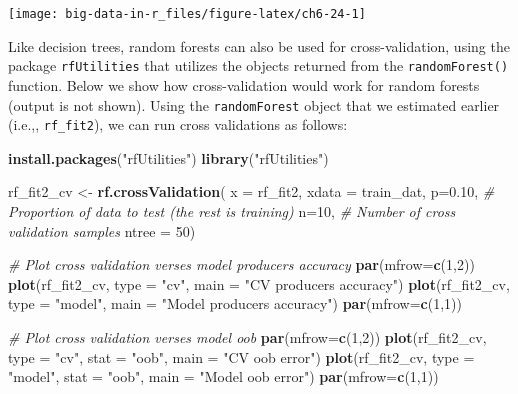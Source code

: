 \documentclass[]{book}
\newenvironment{Shaded}{\begin{snugshade}}{\end{snugshade}}
\newcommand{\CommentTok}[1]{\textcolor[rgb]{0.56,0.35,0.01}{\textit{#1}}}
\newcommand{\DataTypeTok}[1]{\textcolor[rgb]{0.13,0.29,0.53}{#1}}
\newcommand{\DecValTok}[1]{\textcolor[rgb]{0.00,0.00,0.81}{#1}}
\newcommand{\FloatTok}[1]{\textcolor[rgb]{0.00,0.00,0.81}{#1}}
\newcommand{\KeywordTok}[1]{\textcolor[rgb]{0.13,0.29,0.53}{\textbf{#1}}}
\newcommand{\NormalTok}[1]{#1}
\newcommand{\StringTok}[1]{\textcolor[rgb]{0.31,0.60,0.02}{#1}}
\begin{document}
\texttt{[image: big-data-in-r\_files/figure-latex/ch6-24-1]}

Like decision trees, random forests can also be used for cross-validation, using the package \texttt{rfUtilities} that utilizes the objects returned from the \texttt{randomForest()} function. Below we show how cross-validation would work for random forests (output is not shown). Using the \texttt{randomForest} object that we estimated earlier (i.e.,, \texttt{rf\_fit2}), we can run cross validations as follows:

\begin{Shaded}
\begin{Highlighting}[]
\KeywordTok{install.packages}\NormalTok{(}\StringTok{"rfUtilities"}\NormalTok{)}
\KeywordTok{library}\NormalTok{(}\StringTok{"rfUtilities"}\NormalTok{)}

\NormalTok{rf_fit2_cv <-}\StringTok{ }\KeywordTok{rf.crossValidation}\NormalTok{(}
  \DataTypeTok{x =}\NormalTok{ rf_fit2, }
  \DataTypeTok{xdata =}\NormalTok{ train_dat,}
  \DataTypeTok{p=}\FloatTok{0.10}\NormalTok{, }\CommentTok{# Proportion of data to test (the rest is training)}
  \DataTypeTok{n=}\DecValTok{10}\NormalTok{,   }\CommentTok{# Number of cross validation samples}
  \DataTypeTok{ntree =} \DecValTok{50}\NormalTok{)   }


\CommentTok{# Plot cross validation verses model producers accuracy}
\KeywordTok{par}\NormalTok{(}\DataTypeTok{mfrow=}\KeywordTok{c}\NormalTok{(}\DecValTok{1}\NormalTok{,}\DecValTok{2}\NormalTok{)) }
\KeywordTok{plot}\NormalTok{(rf_fit2_cv, }\DataTypeTok{type =} \StringTok{"cv"}\NormalTok{, }\DataTypeTok{main =} \StringTok{"CV producers accuracy"}\NormalTok{)}
\KeywordTok{plot}\NormalTok{(rf_fit2_cv, }\DataTypeTok{type =} \StringTok{"model"}\NormalTok{, }\DataTypeTok{main =} \StringTok{"Model producers accuracy"}\NormalTok{)}
\KeywordTok{par}\NormalTok{(}\DataTypeTok{mfrow=}\KeywordTok{c}\NormalTok{(}\DecValTok{1}\NormalTok{,}\DecValTok{1}\NormalTok{)) }

\CommentTok{# Plot cross validation verses model oob}
\KeywordTok{par}\NormalTok{(}\DataTypeTok{mfrow=}\KeywordTok{c}\NormalTok{(}\DecValTok{1}\NormalTok{,}\DecValTok{2}\NormalTok{)) }
\KeywordTok{plot}\NormalTok{(rf_fit2_cv, }\DataTypeTok{type =} \StringTok{"cv"}\NormalTok{, }\DataTypeTok{stat =} \StringTok{"oob"}\NormalTok{, }\DataTypeTok{main =} \StringTok{"CV oob error"}\NormalTok{)}
\KeywordTok{plot}\NormalTok{(rf_fit2_cv, }\DataTypeTok{type =} \StringTok{"model"}\NormalTok{, }\DataTypeTok{stat =} \StringTok{"oob"}\NormalTok{, }\DataTypeTok{main =} \StringTok{"Model oob error"}\NormalTok{)    }
\KeywordTok{par}\NormalTok{(}\DataTypeTok{mfrow=}\KeywordTok{c}\NormalTok{(}\DecValTok{1}\NormalTok{,}\DecValTok{1}\NormalTok{)) }
\end{Highlighting}
\end{Shaded}
\end{document}
